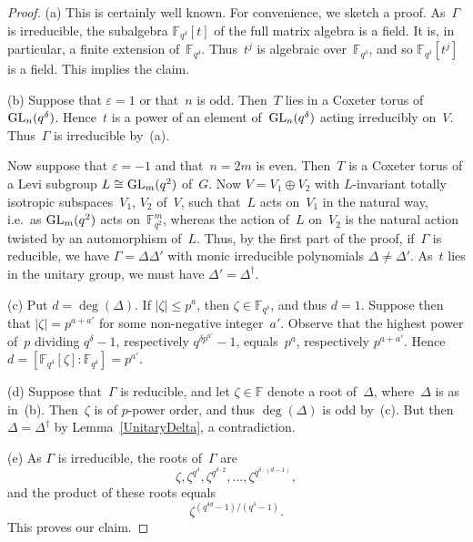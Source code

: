 \documentclass[10pt,a4paper]{amsart}
\def\GL{ \text{\rm GL} }
\begin{document}
\begin{proof}
(a) This is certainly well known. For convenience, we sketch a proof.
As~$\Gamma$ is irreducible, the subalgebra $\mathbb{F}_{q^{\delta}}[t]$ of the 
full matrix algebra is a field. It is, in particular, a finite extension 
of~$\mathbb{F}_{q^{\delta}}$. Thus~$t^j$ is algebraic 
over~$\mathbb{F}_{q^{\delta}}$, and so $\mathbb{F}_{q^{\delta}}[t^j]$ is a 
field. This implies the claim.

(b) Suppose that $\varepsilon = 1$ or that~$n$ is odd. Then~$T$ lies in a 
Coxeter torus of~$\GL_n( q^{\delta} )$. Hence~$t$ is a power of an element 
of~$\GL_n( q^{\delta} )$ acting irreducibly on~$V$. 
Thus~$\Gamma$ is irreducible by~(a). 

Now suppose that $\varepsilon = -1$ and that~$n = 2m$ is even. Then~$T$ is a
Coxeter torus of a Levi subgroup $L \cong \GL_m( q^2 )$ of~$G$. Now 
$V = V_1 \oplus V_2$ with $L$-invariant totally isotropic 
subspaces~$V_1$, $V_2$ of~$V$, such that~$L$ acts on~$V_1$ in 
the natural way, i.e.\ as $\GL_m( q^2 )$ acts on~$\mathbb{F}^m_{q^2}$, whereas 
the action of~$L$ on~$V_2$ is the natural action twisted by an automorphism 
of~$L$. Thus, by the first part of the proof, if~$\Gamma$ is reducible, we have 
$\Gamma = \Delta \Delta'$ with monic irreducible polynomials 
$\Delta \neq \Delta'$. As~$t$ lies in the unitary group, we must have 
$\Delta' = \Delta^{\dagger}$.

(c) Put $d = \deg( \Delta )$. If $|\zeta| \leq p^a$, then 
$\zeta \in \mathbb{F}_{q^{\delta}}$, and thus $d = 1$. 
Suppose then that $|\zeta|= p^{a + a'}$ for some non-negative integer~$a'$. 
Observe that the highest power of~$p$ dividing $q^{\delta} - 1$, respectively 
$q^{\delta p^{a'}} - 1$, equals~$p^a$, respectively $p^{a+a'}$. 
Hence
$d = [\mathbb{F}_{q^{\delta}}[\zeta]\colon\!\mathbb{F}_{q^{\delta}}] = p^{a'}$. 

(d) Suppose that~$\Gamma$ is reducible, and let $\zeta \in \mathbb{F}$ denote
a root of~$\Delta$, where~$\Delta$ is as in~(b). Then~$\zeta$ is of $p$-power 
order, and thus $\deg(\Delta)$ is odd by~(c). But then 
$\Delta = \Delta^{\dagger}$ by Lemma~\ref{UnitaryDelta}, a contradiction.

(e) As $\Gamma$ is irreducible,
the roots of~$\Gamma$ are
$$\zeta, \zeta^{q^{\delta}}, \zeta^{q^{\delta \cdot 2}}, \ldots ,
\zeta^{q^{\delta \cdot(d - 1)}},$$
and the product of these roots equals
$$\zeta^{(q^{\delta d} - 1)/(q^{\delta} - 1)}.$$
This proves our claim.
\end{proof}
\end{document}
